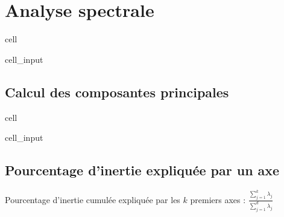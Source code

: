 \documentclass[letterpaper,10pt,french]{sphinxmanual}
\begin{document}
\section{Analyse spectrale}
\label{\detokenize{acp:analyse-spectrale}}
\begin{sphinxuseclass}{cell}
\begin{sphinxuseclass}{cell_input}
\begin{sphinxVerbatim}[commandchars=\\\{\}]
  
   
  \PYG{p}{[}\PYG{p}{[}\PYG{p}{]}    \PYG{p}{]}
\end{sphinxVerbatim}

\end{sphinxuseclass}
\end{sphinxuseclass}

\subsection{Calcul des composantes principales}
\label{\detokenize{acp:calcul-des-composantes-principales}}
\begin{sphinxuseclass}{cell}
\begin{sphinxuseclass}{cell_input}
\begin{sphinxVerbatim}[commandchars=\\\{\}]
  \PYG{p}{[}\PYG{p}{]}
   
      \PYG{p}{[}\PYG{p}{]}
\end{sphinxVerbatim}

\end{sphinxuseclass}
\end{sphinxuseclass}

\subsection{Pourcentage d’inertie expliquée par un axe}
\label{\detokenize{acp:pourcentage-d-inertie-expliquee-par-un-axe}}
\sphinxAtStartPar
Pourcentage d’inertie cumulée expliquée par les \(k\) premiers axes : \(\frac{\displaystyle\sum_{j=1}^k\lambda_j}{\displaystyle\sum_{j=1}^d\lambda_j}\)
\end{document}
